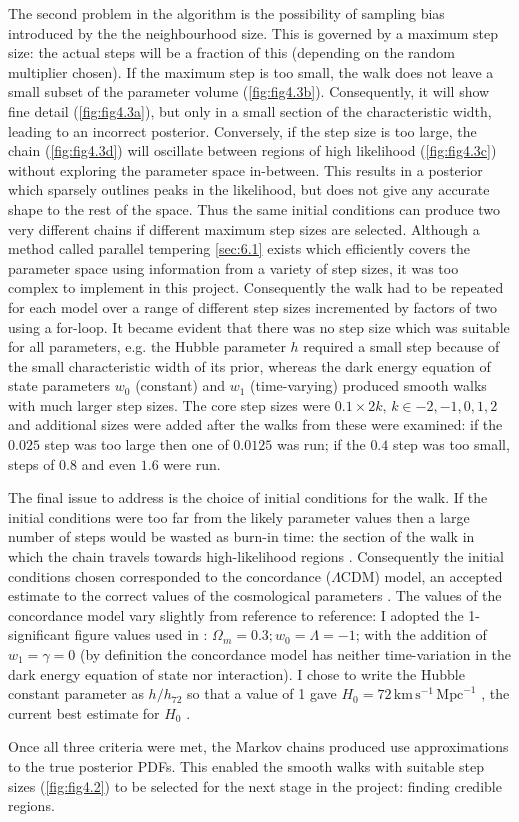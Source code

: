 The second problem in the algorithm is the possibility of sampling bias introduced by the the neighbourhood size. This is governed by a maximum step size: the actual steps will be a fraction of this (depending on the random multiplier chosen). If the maximum step is too small, the walk does not leave a small subset of the parameter volume (\cref{fig:fig4.3b}). Consequently, it will show fine detail (\cref{fig:fig4.3a}), but only in a small section of the characteristic width, leading to an incorrect posterior. Conversely, if the step size is too large, the chain (\cref{fig:fig4.3d}) will oscillate between regions of high likelihood (\cref{fig:fig4.3c}) without exploring the parameter space in-between. This results in a posterior which sparsely outlines peaks in the likelihood, but does not give any accurate shape to the rest of the space. Thus the same initial conditions can produce two very different chains if different maximum step sizes are selected. Although a method called parallel tempering \cref{sec:6.1} exists which efficiently covers the parameter space using information from a variety of step sizes, it was too complex to implement in this project. Consequently the walk had to be repeated for each model over a range of different step sizes incremented by factors of two using a for-loop. It became evident that there was no step size which was suitable for all parameters, e.g. the Hubble parameter $h$ required a small step because of the small characteristic width of its prior, whereas the dark energy equation of state parameters $w_0$ (constant) and $w_1$ (time-varying) produced smooth walks with much larger step sizes. The core step sizes were $0.1 \times 2k ,\, k \in {-2, -1, 0, 1, 2}$ and additional sizes were added after the walks from these were examined: if the $0.025$ step was too large then one of $0.0125$ was run; if the $0.4$ step was too small, steps of $0.8$ and even $1.6$ were run.

The final issue to address is the choice of initial conditions for the walk. If the initial conditions were too far from the likely parameter values then a large number of steps would be wasted as burn-in time: the section of the walk in which the chain travels towards high-likelihood regions \cite{Gregory2005}. Consequently the initial conditions chosen corresponded to the concordance ($\Lambda$CDM) model, an accepted estimate to the correct values of the cosmological parameters \cite{Hartle2003}. The values of the concordance model vary slightly from reference to reference: I adopted the 1-significant figure values used in \cite{Hartle2003}: $\Omega_m = 0.3; w_0 = \Lambda = -1$; with the addition of $w_1 = \gamma = 0$ (by definition the concordance model has neither time-variation in the dark energy equation of state nor interaction). I chose to write the Hubble constant parameter as $h/h_{72}$ so that a value of 1 gave $H_0 = 72\,\mathrm{km}\,\mathrm{s}^{-1}\,\mathrm{Mpc}^{-1}$ , the current best estimate for $H_0$ \cite{Riess2009}.

Once all three criteria were met, the Markov chains produced use approximations to the true posterior PDFs. This enabled the smooth walks with suitable step sizes (\cref{fig:fig4.2}) to be selected for the next stage in the project: finding credible regions.
